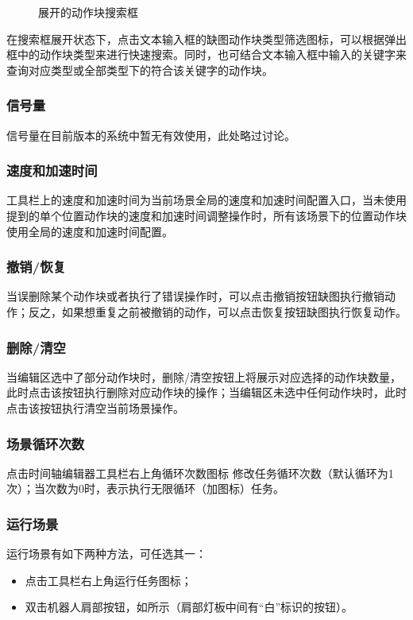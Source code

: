 \begin{figure}[ht]
	\centering
	\color{red}{缺图}
	\caption{展开的动作块搜索框}
	\label{fig:展开的动作块搜索框}
\end{figure}

在搜索框展开状态下，点击文本输入框的{\color{red}缺图}动作块类型筛选图标，可以根据弹出框中的动作块类型来进行快速搜索。同时，也可结合文本输入框中输入的关键字来查询对应类型或全部类型下的符合该关键字的动作块。
\subsubsection{信号量}
信号量在目前版本的\LM 系统中暂无有效使用，此处略过讨论。
\subsubsection{速度和加速时间}
\label{sec:速度和加速时间}
工具栏上的速度和加速时间为当前场景全局的速度和加速时间配置入口，当未使用提到的单个位置动作块的速度和加速时间调整操作时，所有该场景下的位置动作块使用全局的速度和加速时间配置。
\subsubsection{撤销/恢复}
当误删除某个动作块或者执行了错误操作时，可以点击撤销按钮{\color{red}缺图}执行撤销动作；反之，如果想重复之前被撤销的动作，可以点击恢复按钮{\color{red}缺图}执行恢复动作。

\subsubsection{删除/清空}
当编辑区选中了部分动作块时，删除/清空按钮上将展示对应选择的动作块数量，此时点击该按钮执行删除对应动作块的操作；当编辑区未选中任何动作块时，此时点击该按钮执行清空当前场景操作。

\subsubsection{场景循环次数}
点击时间轴编辑器工具栏右上角循环次数图标 修改任务循环次数（默认循环为1次）；当次数为0时，表示执行无限循环（加图标）任务。
\subsubsection{运行场景}
\label{sec:运行场景}
运行场景有如下两种方法，可任选其一：
\begin{itemize}
	\item 点击工具栏右上角运行任务图标；
	\item 双击机器人肩部按钮，如所示（肩部灯板中间有“白”标识的按钮）。
\end{itemize}

